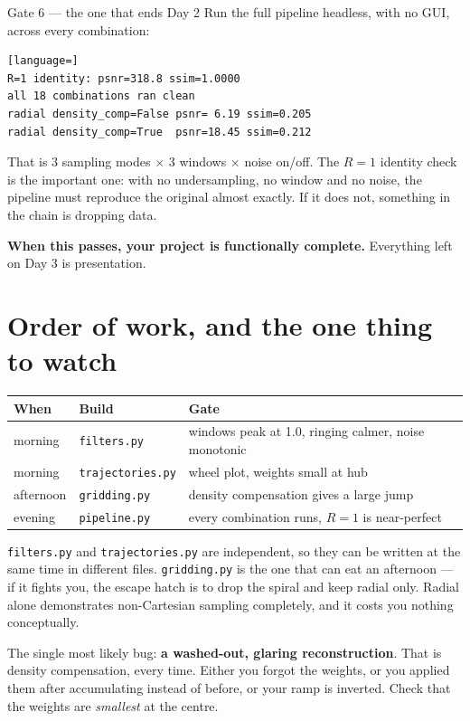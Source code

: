 \documentclass[11pt,a4paper]{article}
\begin{document}
\begin{gatebox}{Gate 6 --- the one that ends Day 2}
Run the full pipeline headless, with no GUI, across every combination:
\begin{lstlisting}[language=]
R=1 identity: psnr=318.8 ssim=1.0000
all 18 combinations ran clean
radial density_comp=False psnr= 6.19 ssim=0.205
radial density_comp=True  psnr=18.45 ssim=0.212
\end{lstlisting}
That is 3 sampling modes $\times$ 3 windows $\times$ noise on/off. The $R=1$
identity check is the important one: with no undersampling, no window and no
noise, the pipeline must reproduce the original almost exactly. If it does not,
something in the chain is dropping data.

\textbf{When this passes, your project is functionally complete.} Everything left
on Day 3 is presentation.
\end{gatebox}

\section{Order of work, and the one thing to watch}

\begin{center}
\begin{tabular}{@{}llp{6.9cm}@{}}
\toprule
\textbf{When} & \textbf{Build} & \textbf{Gate} \\
\midrule
morning & \texttt{filters.py} & windows peak at 1.0, ringing calmer, noise monotonic \\
morning & \texttt{trajectories.py} & wheel plot, weights small at hub \\
afternoon & \texttt{gridding.py} & density compensation gives a large jump \\
evening & \texttt{pipeline.py} & every combination runs, $R{=}1$ is near-perfect \\
\bottomrule
\end{tabular}
\end{center}

\texttt{filters.py} and \texttt{trajectories.py} are independent, so they can be
written at the same time in different files. \texttt{gridding.py} is the one that
can eat an afternoon --- if it fights you, the escape hatch is to drop the spiral
and keep radial only. Radial alone demonstrates non-Cartesian sampling
completely, and it costs you nothing conceptually.

\vspace{4pt}
\noindent
The single most likely bug: \textbf{a washed-out, glaring reconstruction}. That
is density compensation, every time. Either you forgot the weights, or you
applied them after accumulating instead of before, or your ramp is inverted.
Check that the weights are \emph{smallest} at the centre.
\end{document}
